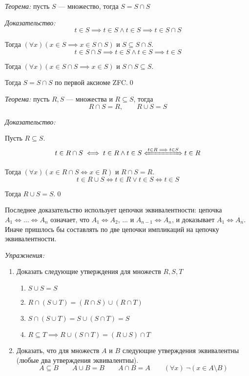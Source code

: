 {\it Теорема:} пусть $S$ --- множество, тогда $S=S\cap S$

{\it Доказательство:}
\[
	t\in S\implies t\in S\land t\in S\implies t\in S\cap S
\]

Тогда $(\forall x)(x\in S\implies x\in S\cap S)$ и $S\subseteq S\cap S$.
\[
	t\in S\cap S\implies t\in S\land t\in S\implies t\in S
\]

Тогда $(\forall x)(x\in S\cap S\implies x\in S)$ и $S\cap S\subseteq S$.

Тогда $S=S\cap S$ по первой аксиоме ZFC.\qed

\vspace{1em}
{\it Теорема:} пусть $R,S$ --- множества и $R\subseteq S$, тогда
\[
	R\cap S= R,\qquad R\cup S= S
\]

{\it Доказательство:}

Пусть $R\subseteq S$.
\[
	t\in R\cap S\iff t\in R\land t\in S\xLeftrightarrow{t\in R\implies t\in S} t\in R
\]

Тогда $(\forall x)(x\in R\cap S\iff x\in R)$ и $R\cap S=R$.
\[
	t\in R\cup S\iff t\in R\lor t\in S\iff t\in S
\]

Тогда $R\cup S=S$.\qed

Последнее доказательство использует цепочки эквивалентности:
цепочка $A_1\iff...\iff A_{n}$ означает, что $A_1\iff A_2$, ... и
$A_{n-1}\iff A_{n}$, и доказывает $A_1\iff A_{n}$. Иначе пришлось
бы составлять по две цепочки импликаций на цепочку эквивалентности.

\pagebreak

\newcommand\eset{\varnothing}
{\it Упражнения:}
\begin{enumerate}
	\item{}Доказать следующие утверждения для множеств $R,S,T$
	\begin{fullwidth}
		\begin{multicols}{2}
			\begin{enumerate}
				\item{}$S\cup S=S$
				\item{}$R\cap (S\cup T)=(R\cap S)\cup (R\cap T)$
				\item{}$S\cap (S\cup T)=S\cup (S\cap T)=S$
				\item{}$R\subseteq T\implies R\cup (S\cap T)=(R\cup S)\cap T$
			\end{enumerate}
		\end{multicols}
	\end{fullwidth}

	\item{}Доказать, что для множеств $A$ и $B$ следующие утверждения эквивалентны
	(любые два утверждения эквивалентны).
	\[
		A\subseteq B\qquad A\cup B=B\qquad A\cap B=A
		\qquad (\forall x)~\lnot(x\in A\setminus B)
	\]
\end{enumerate}

